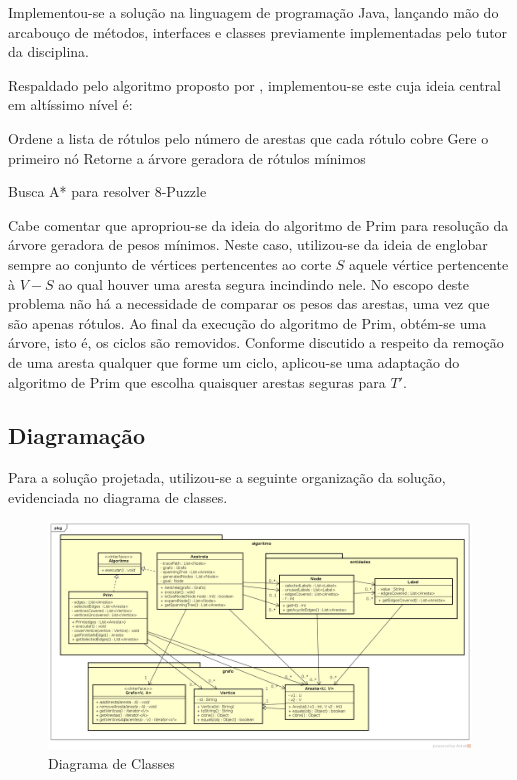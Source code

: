 \documentclass[12pt]{article}
\begin{document}
		Implementou-se a solução na linguagem de programação Java, lançando mão do arcabouço de métodos, interfaces e classes previamente implementadas pelo tutor da disciplina.

		Respaldado pelo algoritmo proposto por \cite{chang:1996}, implementou-se este cuja ideia central em altíssimo nível é:

		\begin{algorithm}[H]
			\SetAlgoLined
			Ordene a lista de rótulos pelo número de arestas que cada rótulo cobre\;
			Gere o primeiro nó\;
			Retorne a árvore geradora de rótulos mínimos\;
			\caption{Busca A* para resolver 8-Puzzle}
		\end{algorithm}

		Cabe comentar que apropriou-se da ideia do algoritmo de Prim para resolução da árvore geradora de pesos mínimos. Neste caso, utilizou-se da ideia de englobar sempre ao conjunto de vértices pertencentes ao corte $S$ aquele vértice pertencente à $V - S$ ao qual houver uma aresta segura incindindo nele. No escopo deste problema não há a necessidade de comparar os pesos das arestas, uma vez que são apenas rótulos. Ao final da execução do algoritmo de Prim, obtém-se uma árvore, isto é, os ciclos são removidos. Conforme discutido a respeito da remoção de uma aresta qualquer que forme um ciclo, aplicou-se uma adaptação do algoritmo de Prim que escolha quaisquer arestas seguras para $T'$.

	\subsection{Diagramação}\label{sec:diagramacao}

		Para a solução projetada, utilizou-se a seguinte organização da solução, evidenciada no diagrama de classes.

		\begin{landscape}
		\centering
		\begin{figure}[p]
		\includegraphics[width=1.4\textwidth]{ClassDiagram.png}
		\caption{Diagrama de Classes}
		\label{fig:classDiagram}
		\end{figure}
		\end{landscape}
		\restoregeometry
\end{document}
